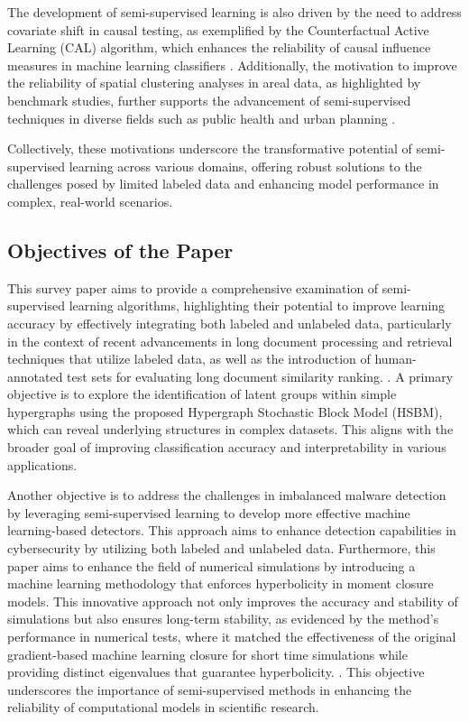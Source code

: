 The development of semi-supervised learning is also driven by the need to address covariate shift in causal testing, as exemplified by the Counterfactual Active Learning (CAL) algorithm, which enhances the reliability of causal influence measures in machine learning classifiers \cite{sen2018supervisingfeatureinfluence}. Additionally, the motivation to improve the reliability of spatial clustering analyses in areal data, as highlighted by benchmark studies, further supports the advancement of semi-supervised techniques in diverse fields such as public health and urban planning \cite{vidanapathirana2022clusterdetectioncapabilitiesaverage}.



Collectively, these motivations underscore the transformative potential of semi-supervised learning across various domains, offering robust solutions to the challenges posed by limited labeled data and enhancing model performance in complex, real-world scenarios.



\subsection{Objectives of the Paper} \label{subsec:Objectives of the Paper}

This survey paper aims to provide a comprehensive examination of semi-supervised learning algorithms, highlighting their potential to improve learning accuracy by effectively integrating both labeled and unlabeled data, particularly in the context of recent advancements in long document processing and retrieval techniques that utilize labeled data, as well as the introduction of human-annotated test sets for evaluating long document similarity ranking. \cite{ginzburg2021selfsuperviseddocumentsimilarityranking}. A primary objective is to explore the identification of latent groups within simple hypergraphs using the proposed Hypergraph Stochastic Block Model (HSBM), which can reveal underlying structures in complex datasets. This aligns with the broader goal of improving classification accuracy and interpretability in various applications.



Another objective is to address the challenges in imbalanced malware detection by leveraging semi-supervised learning to develop more effective machine learning-based detectors. This approach aims to enhance detection capabilities in cybersecurity by utilizing both labeled and unlabeled data. Furthermore, this paper aims to enhance the field of numerical simulations by introducing a machine learning methodology that enforces hyperbolicity in moment closure models. This innovative approach not only improves the accuracy and stability of simulations but also ensures long-term stability, as evidenced by the method's performance in numerical tests, where it matched the effectiveness of the original gradient-based machine learning closure for short time simulations while providing distinct eigenvalues that guarantee hyperbolicity. \cite{huang2021machinelearningmomentclosure}. This objective underscores the importance of semi-supervised methods in enhancing the reliability of computational models in scientific research.



